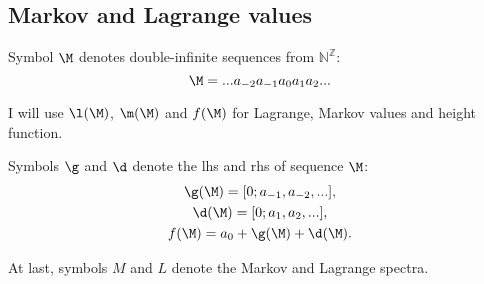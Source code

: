 \subsection{Markov and Lagrange values}

Symbol $\M$ denotes double-infinite sequences from $\mathbb{N}^\mathbb{Z}$:
\begin{equation*}
	\M = ...a_{-2}a_{-1}a_0a_1a_2...
\end{equation*}

I will use $\l(\M)$, $\m(\M)$ and $f(\M)$ for Lagrange, Markov values and height function.

Symbols $\g$ and $\d$ denote the lhs and rhs of sequence $\M$:
\begin{gather*}
	\g(\M) = [0; a_{-1}, a_{-2}, ...], \\
	\d(\M) = [0; a_1, a_2, ...], \\
	f(\M) = a_0 + \g(\M) + \d(\M).
\end{gather*}

At last, symbols $M$ and $L$ denote the Markov and Lagrange spectra.
